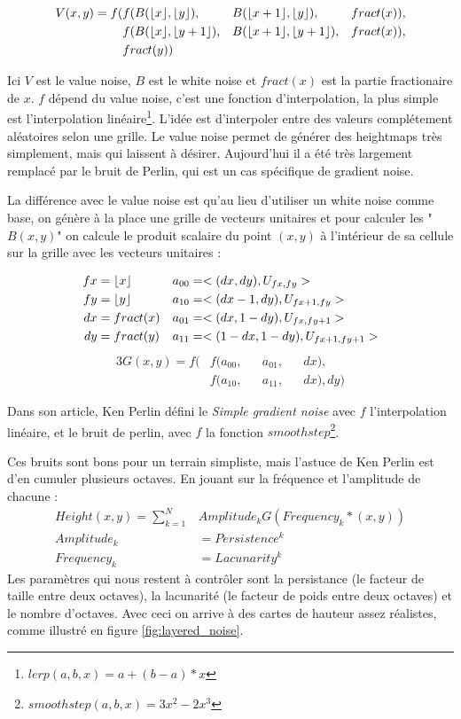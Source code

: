 \documentclass[11pt]{article} %
\DeclarePairedDelimiter\floor{\lfloor}{\rfloor}%
\DeclarePairedDelimiter\fract{fract(}{)}
\begin{document}
\begin{alignat*}{3}
	V(x,y) =f( &f(B(\floor{x},\floor{y}), &&B(\floor{x+1},\floor{y}), &&\fract{x}),\\
			&f(B(\floor{x},\floor{y+1}), &&B(\floor{x+1},\floor{y+1}), &&\fract{x}),\\
			&\fract{y})
\end{alignat*}

Ici $V$ est le value noise, $B$ est le white noise et $fract(x)$ est la partie fractionaire de $x$. $f$ dépend du value noise, c'est une fonction d'interpolation, la plus simple est l'interpolation linéaire\footnote{$lerp(a,b,x) = a+(b-a)*x$}.
L'idée est d'interpoler entre des valeurs complétement aléatoires selon une grille. Le value noise permet de générer des heightmaps très simplement, mais qui laissent à désirer. Aujourd'hui il a été très largement remplacé par le bruit de Perlin, qui est un cas spécifique de gradient noise.

La différence avec le value noise est qu'au lieu d'utiliser un white noise comme base, on génère à la place une grille de vecteurs unitaires et pour calculer les "$B(x,y)$" on calcule le produit scalaire du point $(x,y)$ à l'intérieur de sa cellule sur la grille avec les vecteurs unitaires :

\begin{align*}
	fx&=\floor{x} & a_{00}&=<(dx,dy), U_{fx,fy}>\\
	fy&=\floor{y} & a_{10}&=<(dx-1,dy), U_{fx+1,fy}>\\
	dx&=\fract{x} & a_{01}&=<(dx,1-dy), U_{fx,fy+1}>\\
	dy&=\fract{y} & a_{11}&=<(1-dx,1-dy), U_{fx+1,fy+1}>
\end{align*}
\begin{alignat*}{3}
	G(x,y) =f( &f(a_{00}, &&a_{01}, &&dx),\\
			&f(a_{10}, &&a_{11}, &&dx), dy)
\end{alignat*}

Dans son article\cite{perlinnoise}, Ken Perlin défini le \textit{Simple gradient noise} avec $f$ l'interpolation linéaire, et le bruit de perlin, avec $f$ la fonction $smoothstep$\footnote{$smoothstep(a,b,x) = 3x^2-2x^3$}.

Ces bruits sont bons pour un terrain simpliste, mais l'astuce de Ken Perlin est d'en cumuler plusieurs octaves. En jouant sur la fréquence et l'amplitude de chacune :
\begin{align*}
	Height(x,y) = \sum_{k=1}^{N}&Amplitude_k G(Frequency_k*(x,y))\\
	Amplitude_k &= Persistence^k\\ 
	Frequency_k &= Lacunarity^k
\end{align*}
Les paramètres qui nous restent à contrôler sont la persistance (le facteur de taille entre deux octaves), la lacunarité (le facteur de poids entre deux octaves) et le nombre d'octaves. Avec ceci on arrive à des cartes de hauteur assez réalistes, comme illustré en figure \ref{fig:layered_noise}.
\end{document}
